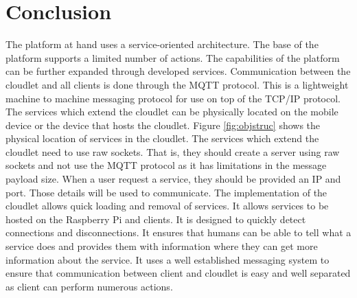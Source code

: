 \section{Conclusion}
The platform at hand uses a service-oriented architecture. The base of the platform supports a limited number of actions. The capabilities of the platform can be further expanded through developed services. Communication between the cloudlet and all clients is done through the MQTT protocol. This is a lightweight machine to machine messaging protocol for use on top of the TCP/IP protocol. The services which extend the cloudlet can be physically located on the mobile device or the device that hosts the cloudlet. Figure \ref{fig:objstruc} shows the physical location of services in the cloudlet. The services which extend the cloudlet need to use raw sockets. That is, they should create a server using raw sockets and not use the MQTT protocol as it has limitations in the message payload size. When a user request a service, they should be provided an IP and port. Those details will be used to communicate.
The implementation of the cloudlet allows quick loading and removal of services.
It allows services to be hosted on the Raspberry Pi and clients. It is designed to quickly detect connections and disconnections. It ensures that humans can be able to tell what a service does and provides them with information where they can get more information about the service. It uses a well established messaging system to ensure that communication between client and cloudlet is easy and well separated as client can perform numerous actions.





